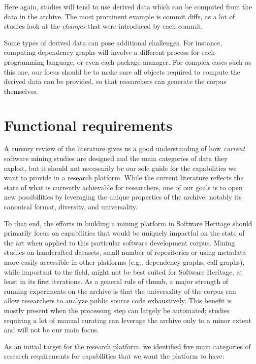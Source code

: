 Here again, studies will tend to use derived data which can be computed from
the data in the archive. The most prominent example is commit diffs, as a lot
of studies look at the \emph{changes} that were introduced by each commit.

Some types of derived data can pose additional challenges. For instance,
computing dependency graphs will involve a different process for each
programming language, or even each package manager. For complex cases such as
this one, our focus should be to make sure all objects required to compute the
derived data can be provided, so that researchers can generate the corpus
themselves.

\section{Functional requirements}

A cursory review of the literature gives us a good understanding of how \emph{current}
software mining studies are designed and the main categories of data they
exploit, but it should not necessarily be our sole guide for the capabilities we
want to provide in a research platform. While the current literature reflects
the state of what is currently achievable for researchers, one of our goals is
to open new possibilities by leveraging the unique properties of the
archive: notably its canonical format, diversity, and universality.

To that end, the efforts in building a mining platform in Software Heritage
should primarily focus on capabilities that would be uniquely impactful on the
state of the art when applied to this particular software development corpus.
Mining studies on handcrafted datasets, small number of repositories or
using metadata more easily accessible in other platforms (e.g., dependency
graphs, call graphs), while important to the field, might not be best
suited for Software Heritage, at least in its first iterations. As a general
rule of thumb, a major strength of running experiments on the archive is that
the universality of the corpus can allow researchers to analyze public source
code exhaustively. This benefit is mostly present when the processing step can
largely be automated; studies requiring a lot of manual curating can leverage
the archive only to a minor extent and will not be our main focus.

As an initial target for the research platform, we identified five main
categories of research requirements for capabilities that we want the platform
to have:

